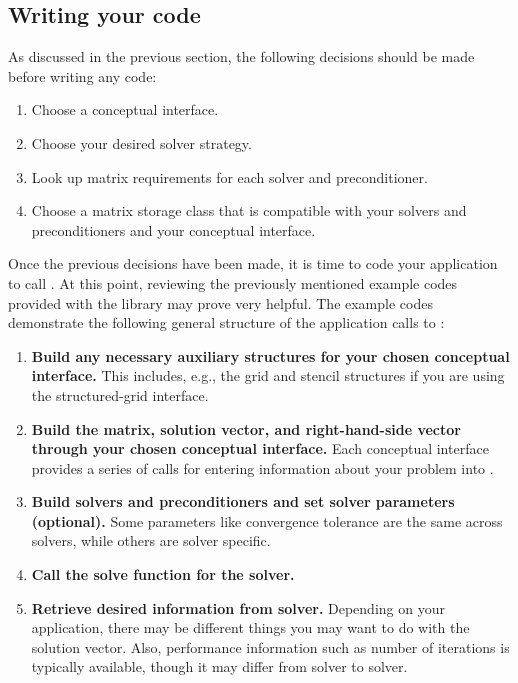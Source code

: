 \subsection{Writing your code}

As discussed in the previous section, the following decisions should
be made before writing any code:

\begin{enumerate}
\item Choose a conceptual interface. 
\item Choose your desired solver strategy.
\item  Look up matrix requirements for each solver and preconditioner.
\item Choose a matrix storage class that is compatible with your solvers and
preconditioners and your conceptual interface.
\end{enumerate}

Once the previous decisions have been made, it is time to code your
application to call \hypre{}.  At this point, reviewing the previously
mentioned example codes provided with the \hypre{} library may prove
very helpful.  The example codes demonstrate the following general structure 
of the application calls to \hypre{}:

\begin{enumerate}

\item
{\bf Build any necessary auxiliary structures for your chosen
conceptual interface.} This includes, e.g., the grid and stencil
structures if you are using the structured-grid interface.

\item
{\bf Build the matrix, solution vector, and right-hand-side vector
through your chosen conceptual interface.}  Each conceptual interface
provides a series of calls for entering information about your problem
into \hypre{}.

\item
{\bf Build solvers and preconditioners and set solver parameters
(optional).}  Some parameters like convergence tolerance are the same
across solvers, while others are solver specific.

\item
{\bf Call the solve function for the solver.}

\item
{\bf Retrieve desired information from solver.} Depending on your
application, there may be different things you may want to do with the
solution vector.  Also, performance information such as number of
iterations is typically available, though it may differ from solver to
solver.

\end{enumerate}


